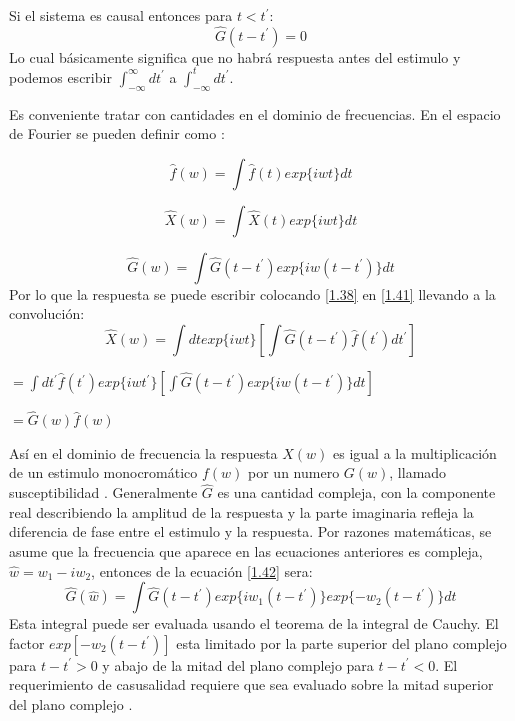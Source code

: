 \documentclass[a4paper,openright,12pt]{book}
\begin{document}
Si el sistema es causal entonces  para $t<t^{'}$:
\begin{equation}\label{1.39}
\hat{G}(t-t^{'})=0 
\end{equation}
Lo cual básicamente significa que no habrá respuesta antes del estimulo y podemos escribir $\int_{-\infty}^{\infty}dt^{'} $ a $\int_{-\infty}^{t}dt^{'}$.

Es conveniente tratar con cantidades en el dominio de frecuencias. En el espacio de Fourier se pueden definir como \cite{OpticalTechniques}:

\begin{equation}\label{1.40}
\hat{f}(w)=\int \hat{f}(t)exp\{iwt\}dt
\end{equation}

\begin{equation}\label{1.41}
\hat{X}(w)=\int \hat{X}(t)exp\{iwt\}dt
\end{equation}

\begin{equation}\label{1.42}
\hat{G}(w)=\int \hat{G}(t-t^{'})exp\{iw(t-t^{'})\}dt
\end{equation}
Por lo que la respuesta se puede escribir colocando \ref{1.38} en \ref{1.41} llevando a la convolución:
\begin{equation}\label{1.43}
\hat{X}(w)=\int dt exp\{iwt\}[\int \hat{G}(t-t^{'})\hat{f}(t^{'})dt^{'}]
\end{equation}
\begin{center}
$
=\displaystyle\int dt^{'}\hat{f}(t^{'})exp\{iwt^{'}\}[\int \hat{G}(t-t^{'})exp\{iw(t-t^{'})\}dt]
$
\end{center}
\begin{center}
$
=\hat{G}(w)\hat{f}(w)
$
\end{center}

Así en el dominio de frecuencia la respuesta $X(w)$ es igual a la multiplicación de un estimulo monocromático $f(w)$ por un numero $G(w)$, llamado susceptibilidad \cite{OpticalTechniques}. Generalmente $\hat{G}$ es una cantidad compleja, con la componente real describiendo la amplitud de la respuesta y la parte imaginaria refleja la diferencia de fase entre el estimulo y la respuesta. Por razones matemáticas, se asume que la frecuencia que aparece en las ecuaciones anteriores es compleja, $\hat{w}=w_{1}-iw_{2}$, entonces de la ecuación \ref{1.42} sera:
\begin{equation}
\hat{G}(\hat{w})=\int \hat{G}(t-t^{'})exp\{iw_{1}(t-t^{'})\} exp\{-w_{2}(t-t^{'})\} dt
\end{equation}
Esta integral puede ser evaluada usando el teorema de la integral de Cauchy. El factor $exp[-w_{2}(t-t^{'})]$ esta 
limitado por la parte superior del plano complejo para $t-t^{'}>0$ y abajo de la mitad del plano complejo para $t-t^{'}<0$. El requerimiento de casusalidad requiere que sea evaluado sobre la mitad superior del plano complejo \cite{electrodynamics}.
\end{document}
